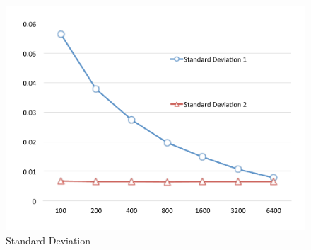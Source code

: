 \documentclass[12pt]{article}
\begin{document}
\begin{figure}
\begin{center}
\includegraphics[width=12cm,bb=0 0 500 400]{numeresult2.pdf}
\caption{Standard Deviation} \label{fig2}
\end{center}
\end{figure} 
\end{document}
